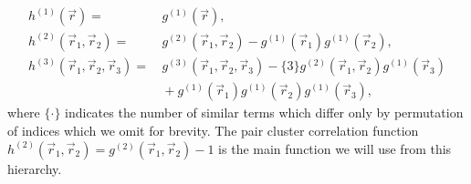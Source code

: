\begin{subequations}\label{eq:cluster-correlation-functions}
  \begin{align}
    h^{(1)}(\vec{r})
    =& \,
    g^{(1)}(\vec{r}),
    \\
    h^{(2)}(\vec{r}_1, \vec{r}_2)
    =& \,
    g^{(2)}(\vec{r}_1, \vec{r}_2)
    - g^{(1)}(\vec{r}_1) g^{(1)}(\vec{r}_2),
    \label{eq:pair-cluster-correlation-function}
    \\
    h^{(3)}(\vec{r}_1, \vec{r}_2, \vec{r}_3)
    =& \,
    g^{(3)}(\vec{r}_1, \vec{r}_2, \vec{r}_3)
    - \{3\} g^{(2)}(\vec{r}_1, \vec{r}_2) g^{(1)}(\vec{r}_3)
    \nonumber \\ & \,
    + g^{(1)}(\vec{r}_1) g^{(1)}(\vec{r}_2) g^{(1)}(\vec{r}_3),
  \end{align}
\end{subequations}
where $\{\cdot\}$ indicates the number of similar terms which differ only by permutation of indices which we omit for brevity.
The pair cluster correlation function%
$h^{(2)}(\vec{r}_1, \vec{r}_2) = g^{(2)}(\vec{r}_1, \vec{r}_2) - 1$ is the main function we will use from this hierarchy.


